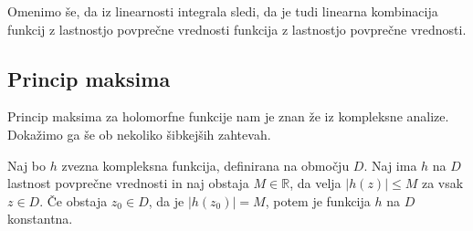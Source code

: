 \documentclass[mat1, tisk]{fmfdelo}
\begin{document}
    Omenimo še, da iz linearnosti integrala sledi, da je tudi linearna kombinacija funkcij z lastnostjo povprečne vrednosti funkcija z lastnostjo povprečne vrednosti. 

\subsection{Princip maksima}

    Princip maksima za holomorfne funkcije nam je znan že iz kompleksne analize. 
    Dokažimo ga še ob nekoliko šibkejših zahtevah.

    \begin{trditev}
        \label{pm_lpv}
        Naj bo $h$ zvezna kompleksna funkcija, definirana na območju $D$. Naj ima $h$ na $D$ lastnost povprečne vrednosti in naj obstaja $M \in \mathbb{R}$, da velja $|h(z)| \leq M$ za vsak $z \in D$. 
        Če obstaja $z_0 \in D$, da je $|h(z_0)| = M$, potem je funkcija $h$ na $D$ konstantna. 
    \end{trditev}
\end{document}
